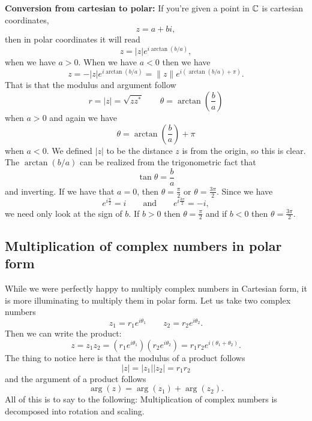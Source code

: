         \noindent \textbf{\textbf{Conversion from cartesian to polar:}} If you're given a point in $\mathbb{C}$ is cartesian coordinates,
        \[
        z=a+bi,
        \]
        then in polar coordinates it will read
        \[
        z=|z|e^{i\arctan(b/a)},
        \]
        when we have $a>0$. When we have $a<0$ then we have
        \[
        z=-|z|e^{i\arctan(b/a)}=\|z\|e^{i(\arctan(b/a)+\pi)}.
        \]
        That is that the modulus and argument follow
        \[
        r = |z|=\sqrt{zz^*} \qquad \theta = \arctan\left( \frac{b}{a}\right)
        \]
        when $a>0$ and again we have
        \[
        \theta = \arctan\left(\frac{b}{a}\right)+\pi
        \]
        when $a<0$. We defined $|z|$ to be the distance $z$ is from the origin, so this is clear.  The $\arctan(b/a)$ can be realized from the trigonometric fact that
        \[
        \tan \theta = \frac{b}{a}
        \]
        and inverting. If we have that $a=0$, then $\theta=\frac{\pi}{2}$ or $\theta=\frac{3\pi}{2}$. Since we have
        \[
        e^{i\frac{\pi}{2}}=i \qquad \textrm{and} \qquad e^{i\frac{3\pi}{2}}=-i,
        \]
        we need only look at the sign of $b$.  If $b>0$ then $\theta=\frac{\pi}{2}$ and if $b<0$ then $\theta=\frac{3\pi}{2}$.


        \subsection{Multiplication of complex numbers in polar form}

        While we were perfectly happy to multiply complex numbers in Cartesian form, it is more illuminating to multiply them in polar form.  Let us take two complex numbers
        \[
        z_1 = r_1 e^{i\theta_1} \qquad z_2 = r_2 e^{i\theta_2}.
        \]
        Then we can write the product:
        \[
        z=z_1 z_2 = (r_1 e^{i\theta_1})(r_2 e^{i\theta_2})= r_1r_2 e^{i(\theta_1+\theta_2)}.
        \]
        The thing to notice here is that the modulus of a product follows
        \[
        |z|=|z_1||z_2|=r_1r_2
        \]
        and the argument of a product follows
        \[
        \arg(z)=\arg(z_1)+\arg(z_2).
        \]
        All of this is to say to the following: Multiplication of complex numbers is decomposed into rotation and scaling.

